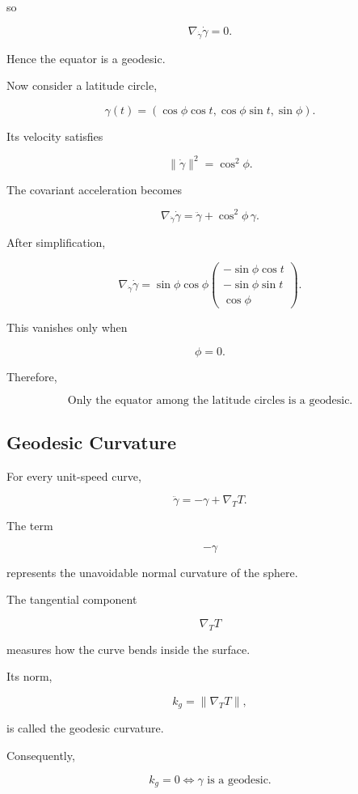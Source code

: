 \documentclass[12pt,a4paper]{article}
\theoremstyle{notespace}
\begin{document}
so

\[
\nabla_{\dot\gamma}\dot\gamma
=
0.
\]

Hence the equator is a geodesic.

Now consider a latitude circle,

\[
\gamma(t)
=
(\cos\phi\cos t,
\cos\phi\sin t,
\sin\phi).
\]

Its velocity satisfies

\[
\|\dot\gamma\|^2
=
\cos^2\phi.
\]

The covariant acceleration becomes

\[
\nabla_{\dot\gamma}\dot\gamma
=
\ddot\gamma
+
\cos^2\phi\,\gamma.
\]

After simplification,

\[
\nabla_{\dot\gamma}\dot\gamma
=
\sin\phi\cos\phi
\begin{pmatrix}
	-\sin\phi\cos t\\
	-\sin\phi\sin t\\
	\cos\phi
\end{pmatrix}.
\]

This vanishes only when

\[
\phi=0.
\]

Therefore,

\[
\boxed{
	\text{Only the equator among the latitude circles is a geodesic.}
}
\]

\subsection{Geodesic Curvature}

For every unit-speed curve,

\[
\ddot\gamma
=
-
\gamma
+
\nabla_TT.
\]

The term

\[
-\gamma
\]

represents the unavoidable normal curvature of the sphere.

The tangential component

\[
\nabla_TT
\]

measures how the curve bends inside the surface.

Its norm,

\[
\boxed{
	k_g
	=
	\|\nabla_TT\|,
}
\]

is called the geodesic curvature.

Consequently,

\[
\boxed{
	k_g=0
	\iff
	\gamma
	\text{ is a geodesic.}
}
\]
\end{document}
